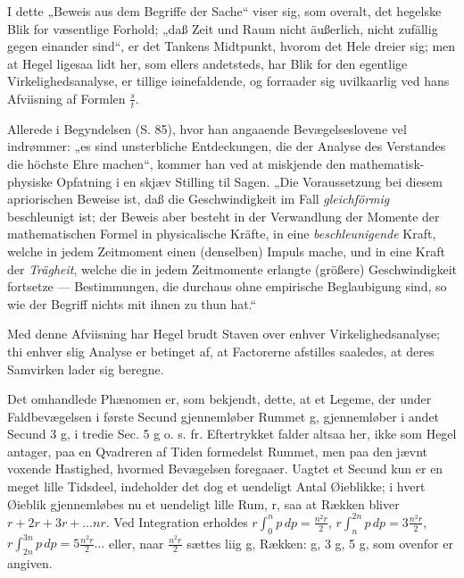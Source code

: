 \documentclass[12pt]{book}
\newcommand{\opage}[1]{\marginnote{\footnotesize\textit{[#1]}}}
\begin{document}
I dette „Beweis aus dem Begriffe der Sache“ viser sig, som overalt, det
hegelske Blik for væsentlige Forhold; „daß Zeit und Raum nicht äußerlich, nicht
zufällig gegen einander sind“, er det Tankens Midtpunkt, hvorom det Hele dreier
sig; men at Hegel ligesaa lidt her, som ellers andetsteds, har Blik for den
egentlige Virkelighedsanalyse, er tillige iøinefaldende, og forraader sig
uvilkaarlig ved hans Afviisning af Formlen $\frac{s}{t}$.

Allerede i Begyndelsen (S. 85), hvor han angaaende Bevægelseslovene vel
indrømmer: „es sind unsterbliche Entdeckungen, die der Analyse des Verstandes
die höchste Ehre machen“, kommer han ved at miskjende den mathematisk-physiske
Opfatning i en skjæv Stilling til Sagen. „Die Voraussetzung bei diesem
apriorischen Beweise ist, daß die Geschwindigkeit im Fall \emph{gleichförmig}
beschleunigt ist; der Beweis aber besteht in der Verwandlung der Momente der
mathematischen Formel in physicalische Kräfte, in eine \emph{beschleunigende}
Kraft, welche in jedem Zeitmoment einen (denselben) Impuls mache, und in eine
Kraft der \emph{Trägheit}, welche die in jedem Zeitmomente erlangte (größere)
Geschwindigkeit fortsetze --- Bestimmungen, die durchaus ohne empirische
Beglaubigung sind, so wie der Begriff nichts mit ihnen zu thun hat.“

\opage{164} Med denne Afviisning har Hegel brudt Staven over enhver Virkelighedsanalyse; thi
enhver slig Analyse er betinget af, at Factorerne afstilles saaledes, at deres
Samvirken lader sig beregne.

Det omhandlede Phænomen er, som bekjendt, dette, at et Legeme, der under
Faldbevægelsen i første Secund gjennemløber Rummet g, gjennemløber i andet Secund
3 g, i tredie Sec. 5 g o. s. fr. Eftertrykket falder altsaa her, ikke som Hegel
antager, paa en Qvadreren af Tiden formedelst Rummet, men paa den jævnt voxende
Hastighed, hvormed Bevægelsen foregaaer. Uagtet et Secund kun er en meget lille
Tidsdeel, indeholder det dog et uendeligt Antal Øieblikke; i hvert Øieblik
gjennemløbes nu et uendeligt lille Rum, r, saa at Rækken bliver
$r + 2r + 3r + \ldots nr$. Ved Integration erholdes
$r\int_0^n p\,dp = \frac{n^2 r}{2}$, $r\int_n^{2n} p\,dp = 3\frac{n^2 r}{2}$,
$r\int_{2n}^{3n} p\,dp = 5\frac{n^2 r}{2} \ldots$ eller, naar $\frac{n^2 r}{2}$
sættes liig g, Rækken: g, 3 g, 5 g, som ovenfor er angiven.
\end{document}
